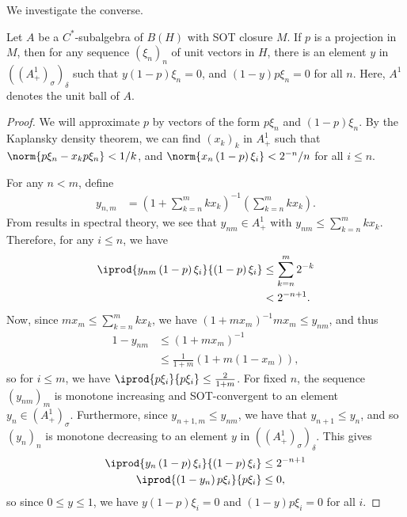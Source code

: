 \documentclass[10pt]{mypackage}
\begin{document}
We investigate the converse.
\begin{lemma}
  Let $A$ be a $C^{\ast}$-subalgebra of $B(H)$ with SOT closure $M$. If $p$ is a projection in $M$, then for any sequence $\left( \xi_n \right)_n$ of unit vectors in $H$, there is an element $y$ in $\left( \left( A_{+}^1 \right)_{\sigma} \right)_{\delta}$ such that $y\left( 1-p \right)\xi_n = 0$, and $\left( 1-y \right)p\xi_n = 0$ for all $n$. Here, $A^{1}$ denotes the unit ball of $A$.
\end{lemma}
\begin{proof}
  We will approximate $p$ by vectors of the form $p\xi_n$ and $\left( 1-p \right)\xi_n$. By the Kaplansky density theorem, we can find $\left( x_k \right)_k$ in $A_{+}^{1}$ such that $\norm{p\xi_n - x_k p \xi_n} < 1/k$, and $\norm{x_n \left( 1-p \right)\xi_i} < 2^{-n}/n$ for all $i\leq n$.

  For any $n < m$, define
  \begin{align*}
    y_{n,m} &= \left( 1 + \sum_{k=n}^{m}kx_k \right)^{-1}\left( \sum_{k=n}^{m}kx_k \right).
  \end{align*}
  From results in spectral theory, we see that $y_{nm}\in A_{+}^1$ with $y_{nm}\leq \sum_{k=n}^{m}kx_k$. Therefore, for any $i\leq n$, we have
  \begin{align*}
    \iprod{y_{nm}\left( 1-p \right)\xi_i}{\left( 1-p \right)\xi_i} &\leq \sum_{k=n}^{m} 2^{-k}\\
                                                                   &< 2^{-n+1}.
  \end{align*}
  Now, since $mx_m \leq \sum_{k=n}^{m}kx_k$, we have $\left( 1+mx_m \right)^{-1}mx_m \leq y_{nm}$, and thus
  \begin{align*}
    1-y_{nm} &\leq \left( 1 + m x_m \right)^{-1}\\
             &\leq \frac{1}{1+m} \left( 1 + m\left( 1-x_m \right) \right),
  \end{align*}
  so for $i\leq m$, we have $ \iprod{p\xi_i}{p\xi_i} \leq \frac{2}{1+m} $. For fixed $n$, the sequence $\left( y_{nm} \right)_m$ is monotone increasing and SOT-convergent to an element $y_n\in \left( A_+^1 \right)_{\sigma}$. Furthermore, since $y_{n+1,m}\leq y_{nm}$, we have that $y_{n+1}\leq y_n$, and so $\left( y_n \right)_n$ is monotone decreasing to an element $y$ in $\left( \left( A_+^1 \right)_{\sigma} \right)_{\delta}$. This gives
  \begin{align*}
    \iprod{y_n \left( 1-p \right)\xi_i}{\left( 1-p \right)\xi_i} &\leq 2^{-n+1}\\
    \iprod{\left( 1-y_n \right)p\xi_i}{p\xi_i} &\leq 0,
  \end{align*}
  so since $0\leq y \leq 1$, we have $y\left( 1-p \right)\xi_i = 0$ and $\left( 1-y \right)p\xi_i = 0$ for all $i$.
\end{proof}
\end{document}
